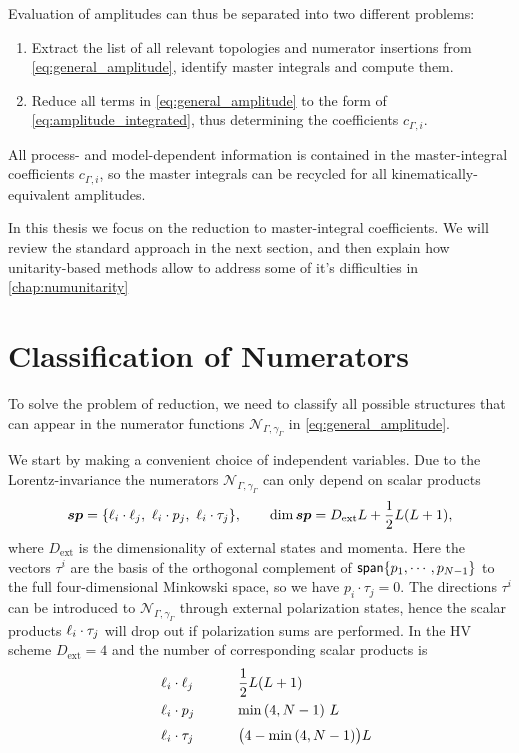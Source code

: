 Evaluation of amplitudes can thus be separated into two different problems:
\begin{enumerate}
  \item Extract the list of all relevant topologies and numerator insertions from \cref{eq:general_amplitude},
    identify master integrals and compute them.
  \item Reduce all terms in \cref{eq:general_amplitude} to the form of \cref{eq:amplitude_integrated}, thus
    determining the coefficients $c_{\Gamma,i}$.
\end{enumerate}
All process- and model-dependent information is contained in the master-integral coefficients $c_{\Gamma,i}$,
so the master integrals can be recycled for all kinematically-equivalent amplitudes.

In this thesis we focus on the reduction to master-integral coefficients.
We will review the standard approach in the next section, and
then explain how unitarity-based methods allow to address some of it's difficulties in \cref{chap:numunitarity}

\section{Classification of Numerators}
\label{sec:classification_numerators}

To solve the problem of reduction,
we need to classify all possible structures that can appear in the numerator functions $\mathcal{N}_{\Gamma,\gamma_\Gamma}$ in \cref{eq:general_amplitude}.

We start by making a convenient choice of independent variables.
Due to the Lorentz-invariance the numerators $\mathcal{N}_{\Gamma,\gamma_\Gamma}$ can only depend on scalar products
\begin{equation}
  \label{eq:sps_all}
  \vb*{sp} = \{ \sp(\ell_i,\ell_j),~\sp(\ell_i,p_j),~\sp(\ell_i, \tau_j) \}, \qquad \dim{\vb*{sp}} = D_{\text{ext}} L + \frac{1}{2}L(L+1),
\end{equation}
where $D_{\text{ext}}$ is the dimensionality of external states and momenta.
Here the vectors $\tau^i$ are the basis of the orthogonal complement of $\mathsf{span}\{p_1,\cdots,p_{N-1}\}$ to the full four-dimensional Minkowski space,
so we have $p_i \cdot \tau_j = 0$.
The directions $\tau^i$ can be introduced to $\mathcal{N}_{\Gamma,\gamma_\Gamma}$ through external polarization states, hence
the scalar products $\sp(\ell_i, \tau_j)$ will drop out if polarization sums are performed.
In the HV scheme $D_{\text{ext}}=4$ and the number of corresponding scalar products is
\begin{equation}
  \label{eq:sp_counts}
  \renewcommand{\arraystretch}{1.5}
  \begin{tabular}[h]{p{10ex} p{20ex}}
       $\sp(\ell_i,\ell_j)$  &   $\dfrac{1}{2}L(L+1)$                \\
        $\sp(\ell_i,p_j)$    &   $\min\qty(4,N-1) ~L$                  \\
       $\sp(\ell_i, \tau_j)$ &   $ \qty\big(4-\min\qty(4,N-1)) L $  \\
  \end{tabular}
\end{equation}

